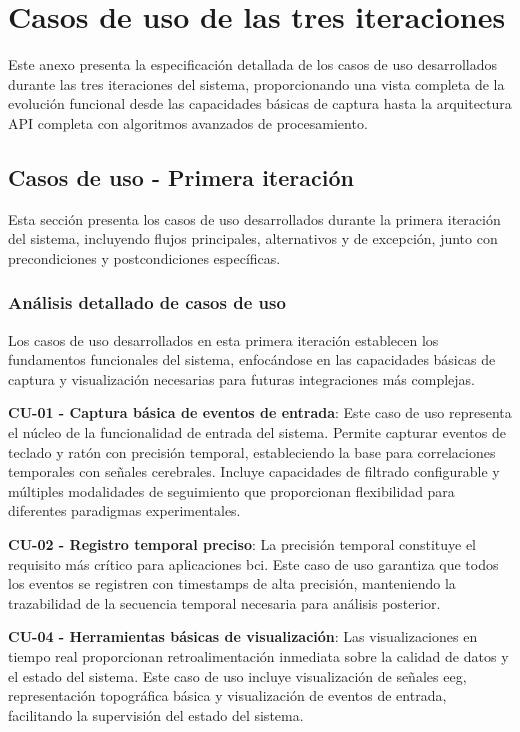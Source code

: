 \chapter[Casos de uso]{Casos de uso de las tres iteraciones}
\label{chap:anexo_casos_uso}

Este anexo presenta la especificación detallada de los casos de uso desarrollados durante las tres iteraciones del sistema, proporcionando una vista completa de la evolución funcional desde las capacidades básicas de captura hasta la arquitectura API completa con algoritmos avanzados de procesamiento.

\section{Casos de uso - Primera iteración}
\label{sec:casos_uso_it1}

Esta sección presenta los casos de uso desarrollados durante la primera iteración del sistema, incluyendo flujos principales, alternativos y de excepción, junto con precondiciones y postcondiciones específicas.

\subsection{Análisis detallado de casos de uso}
\label{subsec:analisis_detallado_casos_uso_it1}

Los casos de uso desarrollados en esta primera iteración establecen los fundamentos funcionales del sistema, enfocándose en las capacidades básicas de captura y visualización necesarias para futuras integraciones más complejas.

\textbf{CU-01 - Captura básica de eventos de entrada}: Este caso de uso representa el núcleo de la funcionalidad de entrada del sistema. Permite capturar eventos de teclado y ratón con precisión temporal, estableciendo la base para correlaciones temporales con señales cerebrales. Incluye capacidades de filtrado configurable y múltiples modalidades de seguimiento que proporcionan flexibilidad para diferentes paradigmas experimentales.

\textbf{CU-02 - Registro temporal preciso}: La precisión temporal constituye el requisito más crítico para aplicaciones \acrshort{bci}. Este caso de uso garantiza que todos los eventos se registren con timestamps de alta precisión, manteniendo la trazabilidad de la secuencia temporal necesaria para análisis posterior.

\textbf{CU-04 - Herramientas básicas de visualización}: Las visualizaciones en tiempo real proporcionan retroalimentación inmediata sobre la calidad de datos y el estado del sistema. Este caso de uso incluye visualización de señales \acrshort{eeg}, representación topográfica básica y visualización de eventos de entrada, facilitando la supervisión del estado del sistema.

